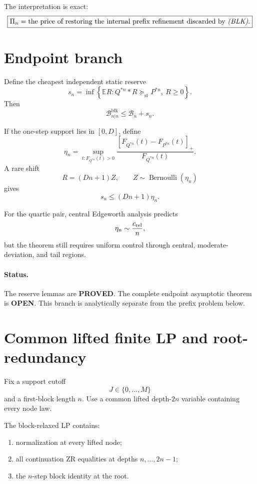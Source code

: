 \documentclass[11pt,a4paper]{article}
\newcommand{\Bcal}{\mathcal B}
\newcommand{\E}{\mathbb E}
\newcommand{\blk}{\mathrm{blk}}
\newcommand{\st}{\mathrm{st}}
\newcommand{\PROVED}{\textcolor{green!45!black}{\textbf{PROVED}}}
\newcommand{\OPEN}{\textcolor{red!70!black}{\textbf{OPEN}}}
\begin{document}
The interpretation is exact:
\[
\boxed{
\Pi_n
=
\text{the price of restoring the internal prefix refinement discarded by
\emph{(BLK)}}.
}
\]

\section{Endpoint branch}

Define the cheapest independent static reserve
\[
s_n
=
\inf\left\{
\E R:
Q^{*n}*R\succeq_{\st}P^{*n},
\ R\ge0
\right\}.
\]
Then
\[
\boxed{
\Bcal^{\blk}_{n|n}\le\Bcal_n+s_n.
}
\tag{11}
\]

If the one-step support lies in \([0,D]\), define
\[
\eta_n
=
\sup_{t:F_{Q^{*n}}(t)>0}
\frac{
[F_{Q^{*n}}(t)-F_{P^{*n}}(t)]_+
}{
F_{Q^{*n}}(t)
}.
\]
A rare shift
\[
R=(Dn+1)Z,
\qquad
Z\sim\operatorname{Bernoulli}(\eta_n)
\]
gives
\[
\boxed{
s_n\le(Dn+1)\eta_n.
}
\tag{12}
\]

For the quartic pair, central Edgeworth analysis predicts
\[
\eta_n\sim\frac{c_{\rm rel}}{n},
\]
but the theorem still requires uniform control through central,
moderate-deviation, and tail regions.

\paragraph{Status.}
The reserve lemmas are \PROVED.
The complete endpoint asymptotic theorem is \OPEN.
This branch is analytically separate from the prefix problem below.

\section{Common lifted finite LP and root-redundancy}

Fix a support cutoff
\[
J\in\{0,\dots,M\}
\]
and a first-block length \(n\).
Use a common lifted depth-\(2n\) variable containing every node law.

The block-relaxed LP contains:
\begin{enumerate}
\item normalization at every lifted node;
\item all continuation ZR equalities at depths \(n,\dots,2n-1\);
\item the \(n\)-step block identity at the root.
\end{enumerate}
\end{document}

